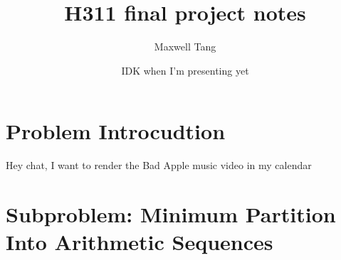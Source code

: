 \documentclass{article}
\title{H311 final project notes}
\author{Maxwell Tang}
\date{IDK when I'm presenting yet}
\begin{document}
\maketitle

\section*{Problem Introcudtion}
Hey chat, I want to render the Bad Apple music video in my calendar

\section*{Subproblem: Minimum Partition Into Arithmetic Sequences}
\end{document}
